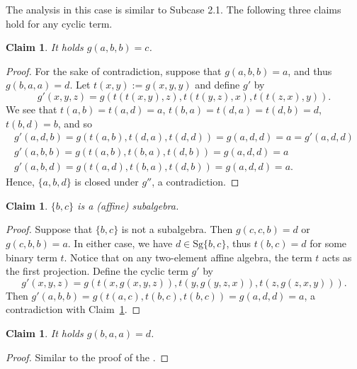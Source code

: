 \documentclass[11pt]{amsart}
\newcommand{\m}[1]{\mathbf{\uppercase{#1}}}
\theoremstyle{definition}
\theoremstyle{remark}
\theoremstyle{plain}
\newtheorem{claim}[thm]{Claim}
\begin{document}
\begin{enumerate}[wide, labelindent=0pt]
\begin{enumerate}[wide, labelindent=0pt]
    The analysis in this case is similar to Subcase 2.1. The following three claims hold for any cyclic term.
    \begin{claim}\label{affine c(abb)=d}
    It holds $g(a,b,b)=c$.
    \end{claim}
    \begin{proof}
    For the sake of contradiction, suppose that $g(a,b,b)=a$, and thus $g(b,a,a)=d$. Let $t(x,y):=g(x,y,y)$ and define $g'$ by $$g'(x,y,z)=g(t(t(x,y),z),t(t(y,z),x),t(t(z,x),y)).$$ We see that $t(a,b)=t(a,d)=a$, $t(b,a)=t(d,a)=t(d,b)=d$, $t(b,d)=b$, and so
    \[
    \begin{gathered}
    g'(a,d,b)=g(t(a,b),t(d,a),t(d,d))=g(a,d,d)=a=g'(a,d,d)\\    g'(a,b,b)=g(t(a,b),t(b,a),t(d,b))=g(a,d,d)=a\\
    g'(a,b,d)=g(t(a,d),t(b,a),t(d,b))=g(a,d,d)=a.
    \end{gathered}
    \] 
    Hence, $\{a,b,d\}$ is closed under $g''$, a contradiction.
    \end{proof}
    \begin{claim}
    $\{b,c\}$ is a (affine) subalgebra.
    \end{claim}
    \begin{proof}
    Suppose that $\{b,c\}$ is not a subalgebra. Then $g(c,c,b)=d$ or $g(c,b,b)=a$. In either case, we have $d\in\mathrm{Sg}\{b,c\}$, thus $t(b,c)=d$ for some binary term $t$. Notice that on any two-element affine algebra, the term $t$ acts as the first projection. Define the cyclic term $g'$ by $$g'(x,y,z)=g(t(x,g(x,y,z)),t(y,g(y,z,x)),t(z,g(z,x,y))).$$ Then $g'(a,b,b)=g(t(a,c),t(b,c),t(b,c))=g(a,d,d)=a$, a contradiction with Claim~\ref{affine c(abb)=d}.
    \end{proof}
    \begin{claim}
    It holds $g(b,a,a)=d$.
    \end{claim}
    \begin{proof}
    Similar to the proof of the .
    \end{proof}

\end{enumerate}
\end{enumerate}
\end{document}
